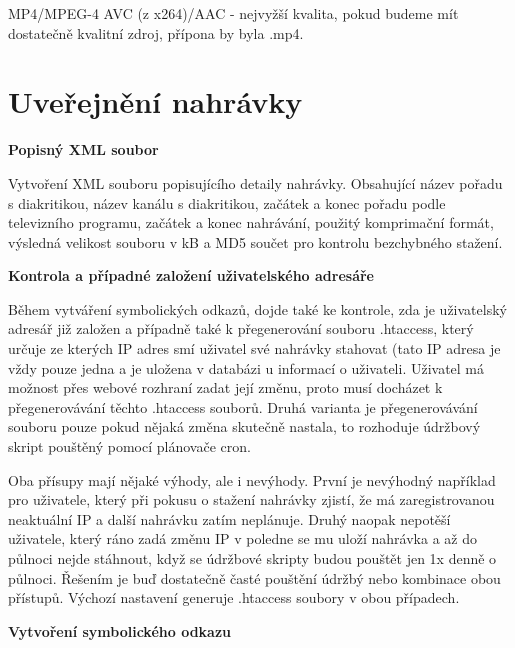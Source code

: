MP4/MPEG-4 AVC (z x264)/AAC - nejvyžší kvalita, pokud budeme mít dostatečně kvalitní zdroj, přípona by byla .mp4.

\vspace{10pt}

\section{Uveřejnění nahrávky}

\vspace{10pt}

\textbf{Popisný XML soubor}

Vytvoření XML souboru popisujícího detaily nahrávky. Obsahující název pořadu s diakritikou, název kanálu s diakritikou, začátek a konec pořadu podle televizního programu, začátek a konec nahrávání, použitý komprimační formát, výsledná velikost souboru v kB a MD5 součet pro kontrolu bezchybného stažení.

\vspace{10pt}

\textbf{Kontrola a případné založení uživatelského adresáře}

Během vytváření symbolických odkazů, dojde také ke kontrole, zda je uživatelský adresář již založen a případně také k přegenerování souboru .htaccess, který určuje ze kterých IP adres smí uživatel své nahrávky stahovat (tato IP adresa je vždy pouze jedna a je uložena v databázi u informací o uživateli. Uživatel má možnost přes webové rozhraní zadat její změnu, proto musí docházet k přegenerovávání těchto .htaccess souborů. Druhá varianta je přegenerovávání souboru pouze pokud nějaká změna skutečně nastala, to rozhoduje údržbový skript pouštěný pomocí plánovače cron. 

\vspace{10pt}

Oba přísupy mají nějaké výhody, ale i nevýhody. První je nevýhodný například pro uživatele, který při pokusu o stažení nahrávky zjistí, že má zaregistrovanou neaktuální IP a další nahrávku zatím neplánuje. Druhý naopak nepotěší uživatele, který ráno zadá změnu IP v poledne se mu uloží nahrávka a až do půlnoci nejde stáhnout, když se údržbové skripty budou pouštět jen 1x denně o půlnoci. Řešením je buď dostatečně časté pouštění údržbý nebo kombinace obou přístupů. Výchozí nastavení generuje .htaccess soubory v obou případech.

\vspace{10pt}

\textbf{Vytvoření symbolického odkazu}

